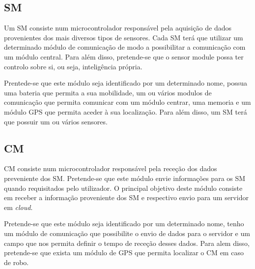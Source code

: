 \newpage
\subsection{\acl{SM}}



Um \acl{SM} consiste num microcontrolador responsável pela aquisição de dados provenientes dos mais diversos tipos de sensores. Cada \acl{SM} terá que utilizar um determinado módulo de comunicação de modo a possibilitar a comunicação com um módulo central. Para além disso, pretende-se que o sensor module possa ter controlo sobre si, ou seja, inteligência própria. 

Prentede-se que este módulo seja identificado por um determinado nome, possua uma bateria que permita a sua mobilidade, um ou vários modulos de comunicação que permita comunicar com um módulo centrar, uma memoria e um módulo \ac{GPS} que permita aceder à sua localização. Para além disso, um \acl{SM} terá que possuir um ou vários sensores.  





\subsection{\acl{CM}}



\acl{CM} consiste num microcontrolador responsável pela receção dos dados preveniente dos \acl{SM}. Pretende-se que este módulo envie informações para os \acl{SM} quando requisitados pelo utilizador. O principal objetivo deste módulo consiste em receber a informação proveniente dos \ac{SM} e respectivo envio para um servidor em \textit{cloud}. 

Pretende-se que este módulo seja identificado por um determinado nome, tenho um  módulo de comunicação que possibilite o envio de dados para o servidor e um campo que nos permita definir o tempo de receção desses dados. Para alem disso, pretende-se que exista um módulo de \ac{GPS} que permita localizar o \acl{CM} em caso de robo.
 





\newpage








